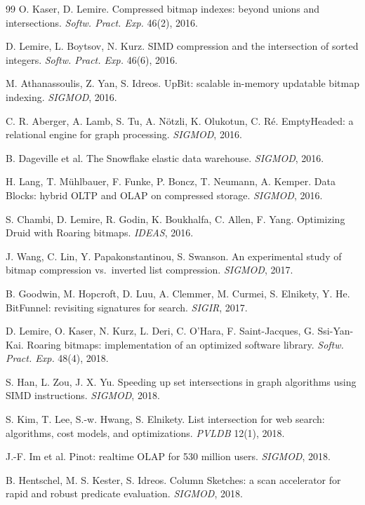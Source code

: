 \documentclass[sigconf,nonacm]{acmart}
\begin{document}
\begin{thebibliography}{99}
 O. Kaser, D. Lemire. Compressed bitmap indexes:
beyond unions and intersections. \emph{Softw. Pract. Exp.} 46(2), 2016.

 D. Lemire, L. Boytsov, N. Kurz. SIMD
compression and the intersection of sorted integers. \emph{Softw.
Pract. Exp.} 46(6), 2016.

 M. Athanassoulis, Z. Yan, S. Idreos. UpBit:
scalable in-memory updatable bitmap indexing. \emph{SIGMOD}, 2016.

 C. R. Aberger, A. Lamb, S. Tu, A. N\"otzli,
K. Olukotun, C. R\'e. EmptyHeaded: a relational engine for graph
processing. \emph{SIGMOD}, 2016.

 B. Dageville et al. The Snowflake elastic data
warehouse. \emph{SIGMOD}, 2016.

 H. Lang, T. M\"uhlbauer, F. Funke, P. Boncz,
T. Neumann, A. Kemper. Data Blocks: hybrid OLTP and OLAP on compressed
storage. \emph{SIGMOD}, 2016.

 S. Chambi, D. Lemire, R. Godin,
K. Boukhalfa, C. Allen, F. Yang. Optimizing Druid with Roaring bitmaps.
\emph{IDEAS}, 2016.

 J. Wang, C. Lin, Y. Papakonstantinou, S. Swanson. An
experimental study of bitmap compression vs.\ inverted list
compression. \emph{SIGMOD}, 2017.

 B. Goodwin, M. Hopcroft, D. Luu, A. Clemmer,
M. Curmei, S. Elnikety, Y. He. BitFunnel: revisiting signatures for
search. \emph{SIGIR}, 2017.

 D. Lemire, O. Kaser, N. Kurz, L. Deri, C. O'Hara,
F. Saint-Jacques, G. Ssi-Yan-Kai. Roaring bitmaps: implementation of an
optimized software library. \emph{Softw. Pract. Exp.} 48(4), 2018.

 S. Han, L. Zou, J. X. Yu. Speeding up set
intersections in graph algorithms using SIMD instructions.
\emph{SIGMOD}, 2018.

 S. Kim, T. Lee, S.-w. Hwang, S. Elnikety. List
intersection for web search: algorithms, cost models, and
optimizations. \emph{PVLDB} 12(1), 2018.

 J.-F. Im et al. Pinot: realtime OLAP for 530
million users. \emph{SIGMOD}, 2018.

 B. Hentschel, M. S. Kester, S. Idreos. Column
Sketches: a scan accelerator for rapid and robust predicate evaluation.
\emph{SIGMOD}, 2018.


\end{thebibliography}
\end{document}
